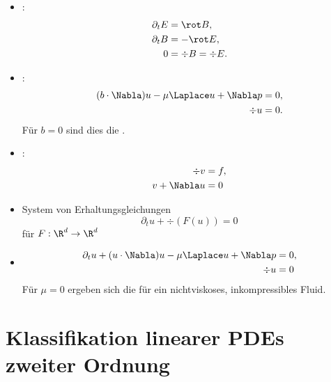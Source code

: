 \begin{ex} \label{1.12}
	\begin{itemize}
		\item
			:
			\begin{align*}
				\partial_t E &= \rot B, \\
				\partial_t B &= - \rot E, \\
				0 &= \div B = \div E.
			\end{align*}
		\item
			:
			\begin{align*}
				(b \cdot \Nabla) u - \mu \Laplace u + \Nabla p &= 0, \\
				\div u &= 0.
			\end{align*}
			Für $b = 0$ sind dies die .
		\item
			:
			\begin{align*}
				\div v &= f, \\
				v + \Nabla u &= 0
			\end{align*}
	\end{itemize}
\end{ex}

\begin{ex} \label{1.13}
	\begin{itemize}
		\item
			System von Erhaltungsgleichungen
			\[
				\partial_t u + \div(F(u)) = 0
			\]
			für $F: \R^d \to \R^d$
		\item
			\begin{align*}
				\partial_t u + (u\cdot \Nabla) u - \mu \Laplace u + \Nabla p &= 0, \\
				\div u &= 0
			\end{align*}
			Für $\mu = 0$ ergeben sich die  für ein nichtviskoses, inkompressibles Fluid.
	\end{itemize}
\end{ex}


\section{Klassifikation linearer PDEs zweiter Ordnung}


